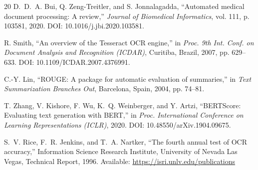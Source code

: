 \documentclass[conference]{IEEEtran}
\begin{document}
\begin{thebibliography}{20}
D.~D.~A. Bui, Q. Zeng-Treitler, and S. Jonnalagadda, ``Automated medical document processing: A review,'' \textit{Journal of Biomedical Informatics}, vol. 111, p. 103581, 2020. DOI: 10.1016/j.jbi.2020.103581.

R. Smith, ``An overview of the Tesseract OCR engine,'' in \textit{Proc. 9th Int. Conf. on Document Analysis and Recognition (ICDAR)}, Curitiba, Brazil, 2007, pp. 629--633. DOI: 10.1109/ICDAR.2007.4376991.

C.-Y. Lin, ``ROUGE: A package for automatic evaluation of summaries,'' in \textit{Text Summarization Branches Out}, Barcelona, Spain, 2004, pp. 74--81.

T. Zhang, V. Kishore, F. Wu, K.~Q. Weinberger, and Y. Artzi, ``BERTScore: Evaluating text generation with BERT,'' in \textit{Proc. International Conference on Learning Representations (ICLR)}, 2020. DOI: 10.48550/arXiv.1904.09675.

S.~V. Rice, F.~R. Jenkins, and T.~A. Nartker, ``The fourth annual test of OCR accuracy,'' Information Science Research Institute, University of Nevada Las Vegas, Technical Report, 1996. Available: \url{https://isri.unlv.edu/publications}

\end{thebibliography}
\end{document}
